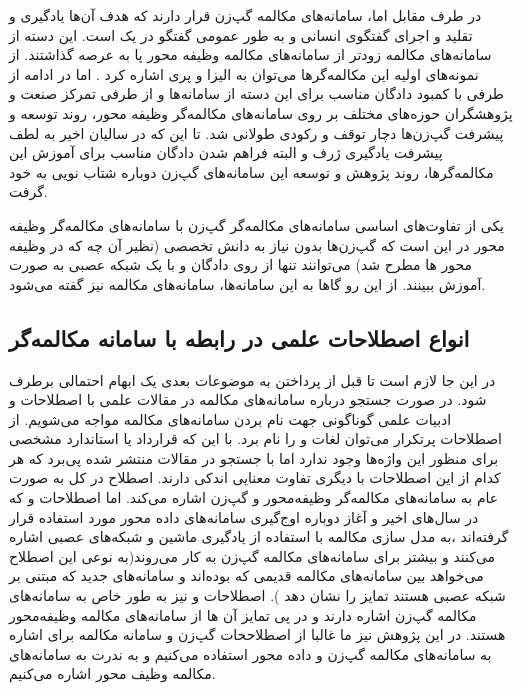 در طرف مقابل اما، سامانه‌های مکالمه گپ‌زن قرار دارند که هدف آن‌ها یادگیری و تقلید و اجرای گفتگوی انسانی و به طور عمومی گفتگو در یک
است.
این دسته از سامانه‌های مکالمه زودتر از سامانه‌های مکالمه وظیفه محور پا به عرصه گذاشتند.
از نمونه‌های اولیه این مکالمه‌گر‌ها می‌توان به الیزا و پری اشاره کرد
\cite{weizenbaum1966eliza, parry}
.
اما در ادامه از طرفی با کمبود دادگان مناسب برای این دسته از سامانه‌ها و از طرفی تمرکز صنعت و پژوهشگران حوزه‌های مختلف بر روی سامانه‌های مکالمه‌گر وظیفه محور، روند توسعه و پیشرفت گپ‌زن‌ها دچار توقف و رکودی طولانی شد. تا این که در سالیان اخیر به لطف پیشرفت یادگیری ژرف و البته فراهم‌ شدن دادگان مناسب برای آموزش این مکالمه‌گر‌ها، روند پژوهش و توسعه این سامانه‌های گپ‌زن دوباره شتاب نویی به خود گرفت.

یکی از تفاوت‌های اساسی سامانه‌های مکالمه‌گر گپ‌زن با سامانه‌های مکالمه‌گر وظیفه محور در این است که گپ‌زن‌ها بدون نیاز به دانش تخصصی (نظیر آن چه که در وظیفه محور ها مطرح شد) می‌توانند تنها از روی دادگان و با یک شبکه عصبی به صورت
آموزش ببینند. از این رو گاها به این سامانه‌ها، سامانه‌های مکالمه 
 نیز گفته می‌شود.

	
\subsection{انواع اصطلاحات علمی در رابطه با سامانه مکالمه‌گر}

در این جا لازم است تا قبل از پرداختن به موضوعات بعدی یک ابهام احتمالی برطرف شود. در صورت جستجو درباره سامانه‌های مکالمه در مقالات علمی با اصطلاحات و ادبیات علمی گوناگونی جهت نام بردن سامانه‌های مکالمه مواجه می‌شویم. از اصطلاحات پرتکرار می‌توان لغات 
و
را نام برد.
با این که قرارداد یا استاندارد مشخصی برای منظور این واژه‌ها وجود ندارد اما با جستجو در مقالات منتشر شده پی‌برد که هر کدام از این اصطلاحات با دیگری تفاوت  معنایی اندکی دارند. اصطلاح 
در کل به صورت عام به سامانه‌های مکالمه‌گر وظیفه‌محور و گپ‌زن اشاره می‌کند. 
اما اصطلاحات 
و
که در سال‌های اخیر و آغاز دوباره اوج‌گیری سامانه‌های داده محور مورد استفاده قرار گرفته‌اند ،به مدل سازی مکالمه با استفاده از یادگیری ماشین و شبکه‌های عصبی اشاره می‌کنند و بیشتر برای سامانه‌های مکالمه گپ‌زن به کار می‌روند(به نوعی این اصطلاح می‌خواهد بین سامانه‌های مکالمه قدیمی که 
بود‌ه‌اند و سامانه‌های جدید که مبتنی بر شبکه عصبی هستند تمایز را نشان دهد ).
اصطلاحات 
و 
نیز به طور خاص به سامانه‌های مکالمه گپ‌زن اشاره دارند و در پی تمایز آن ها از سامانه‌های مکالمه وظیفه‌محور هستند. 
در این پژوهش نیز ما غالبا از اصطلاححات گپ‌زن  و سامانه مکالمه برای اشاره به سامانه‌های مکالمه گپ‌زن و داده محور استفاده می‌کنیم و به ندرت به سامانه‌های مکالمه وظیف محور اشاره می‌کنیم. 

